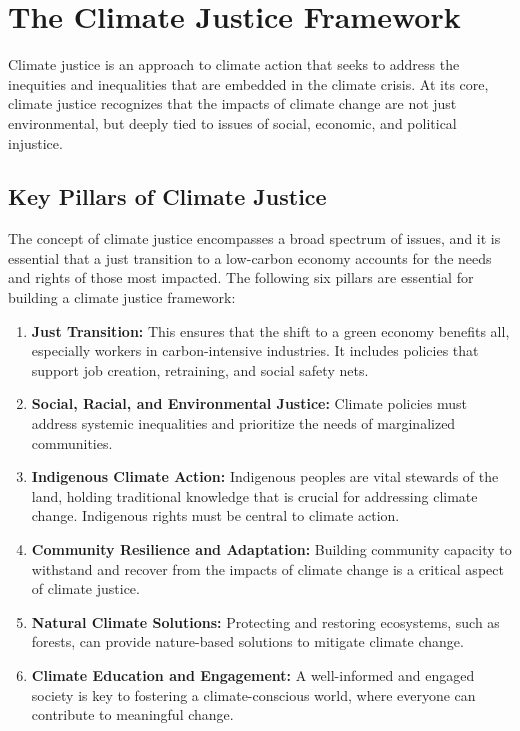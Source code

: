 \documentclass[12pt]{article}
\begin{document}
\section{The Climate Justice Framework}

Climate justice is an approach to climate action that seeks to address the inequities and inequalities that are embedded in the climate crisis. At its core, climate justice recognizes that the impacts of climate change are not just environmental, but deeply tied to issues of social, economic, and political injustice.

\subsection{Key Pillars of Climate Justice}

The concept of climate justice encompasses a broad spectrum of issues, and it is essential that a just transition to a low-carbon economy accounts for the needs and rights of those most impacted. The following six pillars are essential for building a climate justice framework:

\begin{enumerate}
    \item \textbf{Just Transition:} This ensures that the shift to a green economy benefits all, especially workers in carbon-intensive industries. It includes policies that support job creation, retraining, and social safety nets.
    
    \item \textbf{Social, Racial, and Environmental Justice:} Climate policies must address systemic inequalities and prioritize the needs of marginalized communities.
    
    \item \textbf{Indigenous Climate Action:} Indigenous peoples are vital stewards of the land, holding traditional knowledge that is crucial for addressing climate change. Indigenous rights must be central to climate action.
    
    \item \textbf{Community Resilience and Adaptation:} Building community capacity to withstand and recover from the impacts of climate change is a critical aspect of climate justice.
    
    \item \textbf{Natural Climate Solutions:} Protecting and restoring ecosystems, such as forests, can provide nature-based solutions to mitigate climate change.
    
    \item \textbf{Climate Education and Engagement:} A well-informed and engaged society is key to fostering a climate-conscious world, where everyone can contribute to meaningful change.
\end{enumerate}
\end{document}
